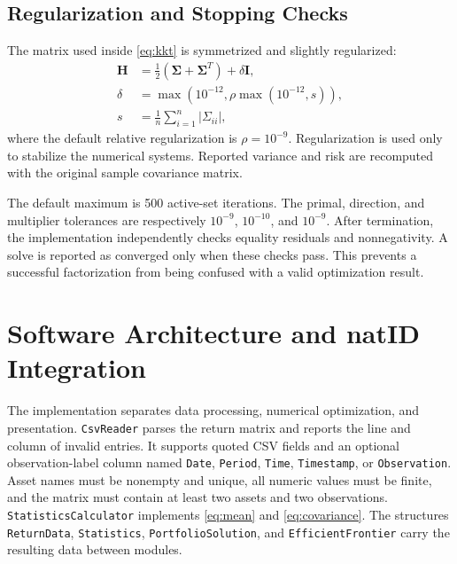 \documentclass[conference]{IEEEtran}
\newcommand{\mat}[1]{\boldsymbol{#1}}
\begin{document}
\subsection{Regularization and Stopping Checks}

The matrix used inside \eqref{eq:kkt} is symmetrized and slightly regularized:
\begin{align}
 \mat{H} &= \tfrac{1}{2}(\mat{\Sigma}+\mat{\Sigma}^{T})+\delta\mat{I},\\
 \delta &= \max\left(10^{-12},\rho\max(10^{-12},s)\right),\\
 s &= \frac{1}{n}\sum_{i=1}^{n}|\Sigma_{ii}|,
 \label{eq:regularization}
\end{align}
where the default relative regularization is $\rho=10^{-9}$. Regularization is
used only to stabilize the numerical systems. Reported variance and risk are
recomputed with the original sample covariance matrix.

The default maximum is 500 active-set iterations. The primal, direction, and
multiplier tolerances are respectively $10^{-9}$, $10^{-10}$, and $10^{-9}$.
After termination, the implementation independently checks equality residuals
and nonnegativity. A solve is reported as converged only when these checks
pass. This prevents a successful factorization from being confused with a
valid optimization result.

\section{Software Architecture and natID Integration}

The implementation separates data processing, numerical optimization, and
presentation. \texttt{CsvReader} parses the return matrix and reports the line
and column of invalid entries. It supports quoted CSV fields and an optional
observation-label column named \texttt{Date}, \texttt{Period}, \texttt{Time},
\texttt{Timestamp}, or \texttt{Observation}. Asset names must be nonempty and
unique, all numeric values must be finite, and the matrix must contain at least
two assets and two observations. \texttt{StatisticsCalculator} implements
\eqref{eq:mean} and \eqref{eq:covariance}. The structures
\texttt{ReturnData}, \texttt{Statistics}, \texttt{PortfolioSolution}, and
\texttt{EfficientFrontier} carry the resulting data between modules.
\end{document}
